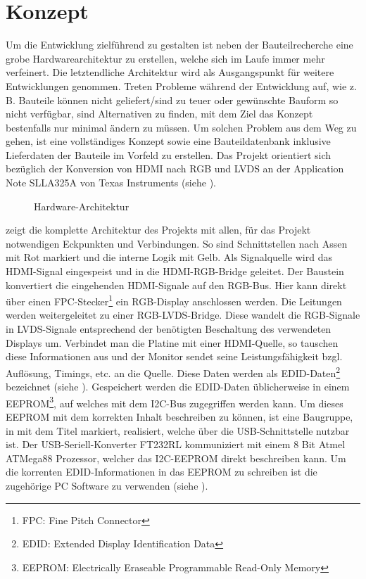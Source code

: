 \section{Konzept}
\label{sec:TeilB_Konzept}
Um die Entwicklung zielführend zu gestalten ist neben der Bauteilrecherche eine grobe Hardwarearchitektur zu erstellen, welche sich im Laufe immer mehr verfeinert. Die letztendliche Architektur wird als Ausgangspunkt für weitere Entwicklungen genommen. Treten Probleme während der Entwicklung auf, wie z. B. Bauteile können nicht geliefert/sind zu teuer oder gewünschte Bauform so nicht verfügbar, sind Alternativen zu finden, mit dem Ziel das Konzept bestenfalls nur minimal ändern zu müssen. Um solchen Problem aus dem Weg zu gehen, ist eine vollständiges Konzept sowie eine Bauteildatenbank inklusive Lieferdaten der Bauteile im Vorfeld zu erstellen. Das Projekt orientiert sich bezüglich der Konversion von HDMI nach RGB und LVDS an der Application Note SLLA325A von Texas Instruments (siehe \cite{TI2011}).
\begin{figure}[htp]
	\centering
{}
	\caption{Hardware-Architektur}
	\label{fig:teilb_architektur}
\end{figure}

 zeigt die komplette Architektur des Projekts mit allen, für das Projekt notwendigen Eckpunkten und Verbindungen. So sind Schnittstellen nach Assen mit Rot markiert und die interne Logik mit Gelb. Als Signalquelle wird das HDMI-Signal eingespeist und in die HDMI-RGB-Bridge geleitet. Der Baustein  konvertiert die eingehenden HDMI-Signale auf den RGB-Bus. Hier kann direkt über einen FPC-Stecker\footnote{FPC: Fine Pitch Connector} ein RGB-Display anschlossen werden. Die Leitungen werden weitergeleitet zu einer RGB-LVDS-Bridge. Diese wandelt die RGB-Signale in LVDS-Signale entsprechend der benötigten Beschaltung des verwendeten Displays um. Verbindet man die Platine mit einer HDMI-Quelle, so tauschen diese Informationen aus und der Monitor sendet seine Leistungsfähigkeit bzgl. Auflösung, Timings, etc. an die Quelle. Diese Daten werden als EDID-Daten\footnote{EDID: Extended Display Identification Data} bezeichnet (siehe \cite{edid2010}). Gespeichert werden die EDID-Daten üblicherweise in einem EEPROM\footnote{EEPROM: Electrically Eraseable Programmable Read-Only Memory}, auf welches mit dem I2C-Bus zugegriffen werden kann. Um dieses EEPROM mit dem korrekten Inhalt beschreiben zu können, ist eine Baugruppe, in  mit dem Titel  markiert, realisiert, welche über die USB-Schnittstelle nutzbar ist. Der USB-Seriell-Konverter FT232RL kommuniziert mit einem 8 Bit Atmel ATMega88 Prozessor, welcher das I2C-EEPROM direkt beschreiben kann. Um die korrenten EDID-Informationen in das EEPROM zu schreiben ist die zugehörige PC Software zu verwenden (siehe ).\newpage